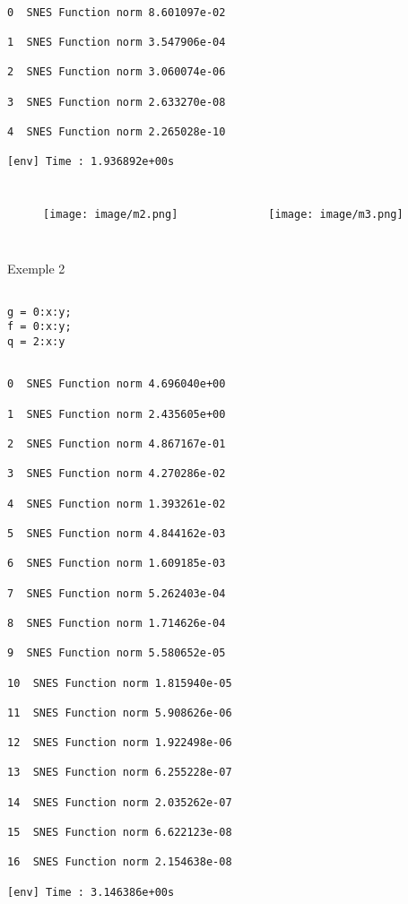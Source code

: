 \documentclass[11pt]{beamer}
\begin{document}
\begin{frame}

\begin{verbatim}

0  SNES Function norm 8.601097e-02

1  SNES Function norm 3.547906e-04

2  SNES Function norm 3.060074e-06

3  SNES Function norm 2.633270e-08

4  SNES Function norm 2.265028e-10

[env] Time : 1.936892e+00s
\end{verbatim}


\begin{columns}
\begin{figure}
\texttt{[image: image/m2.png]}
\end{figure}
\begin{figure}
\texttt{[image: image/m3.png]}
\end{figure}
\end{columns}

\end{frame}




\begin{frame}{Exemple 2}

\begin{verbatim}

g = 0:x:y; 
f = 0:x:y; 
q = 2:x:y
\end{verbatim}


\begin{verbatim}

0  SNES Function norm 4.696040e+00

1  SNES Function norm 2.435605e+00

2  SNES Function norm 4.867167e-01

3  SNES Function norm 4.270286e-02

4  SNES Function norm 1.393261e-02

5  SNES Function norm 4.844162e-03

6  SNES Function norm 1.609185e-03

7  SNES Function norm 5.262403e-04

8  SNES Function norm 1.714626e-04

9  SNES Function norm 5.580652e-05

10  SNES Function norm 1.815940e-05

11  SNES Function norm 5.908626e-06

12  SNES Function norm 1.922498e-06

13  SNES Function norm 6.255228e-07

14  SNES Function norm 2.035262e-07

15  SNES Function norm 6.622123e-08

16  SNES Function norm 2.154638e-08

[env] Time : 3.146386e+00s
\end{verbatim}


\end{frame}
\end{document}
